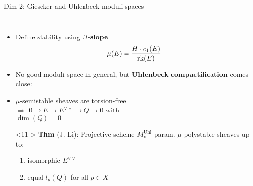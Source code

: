 \documentclass[8pt,handout]{beamer} %
\begin{document}
\begin{frame}[fragile]{Dim 2: Gieseker and Uhlenbeck moduli spaces}
\begin{columns}[t]
        \begin{itemize}
            \item<8-> Define stability using $H$-\textbf{slope}
            \[ \mu(E) = \frac{H \cdot c_1(E)}{\operatorname{\mathrm{rk}}(E)} \]
            \item<9-> No good moduli space in general, but \textbf{Uhlenbeck compactification} comes close:
            \item<10-> $\mu$-semistable sheaves are torsion-free \\
            $\Rightarrow$ \quad $0 \to E \to E^{\vee\vee} \to Q \to 0$ \; with \\ \qquad \; $\dim(Q) = 0$
            \item[]
            \item[]<11-> \textbf{Thm} (J. Li): Projective scheme $M^{\text{Uhl}}_v$ param. $\mu$-polystable sheaves up to:
            \begin{enumerate}
                \item<12-> isomorphic $E^{\vee\vee}$ 
                \item<13-> equal $l_p(Q)$ for all $p \in X$
            \end{enumerate}
        \end{itemize}
    \end{columns}
\end{frame}
\end{document}

